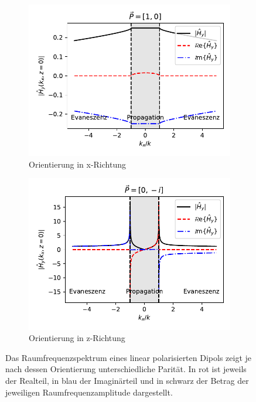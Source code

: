 \documentclass[titlepage,  ngerman]{article}
\begin{document}
	\begin{figure}[h]
		\centering
		\label{fig:spatial_spectrum_zx}
		\begin{subfigure}{0.49\textwidth}
			\centering
			\includegraphics[width=\textwidth]{figures/spatial_spectrum_x.pdf}
			\caption{Orientierung in x-Richtung}
			\label{fig:spatial_spectrum_x}
		\end{subfigure}		
		\begin{subfigure}{0.5\textwidth}
			\centering
			\includegraphics[width=\textwidth]{figures/spatial_spectrum_z.pdf}
			\caption{Orientierung in z-Richtung}
			\label{fig:spatial_spectrum_z}
		\end{subfigure}		
		\caption[Raumfrequenzspektrum linear polarisierter Dipol]{Das Raumfrequenzspektrum eines linear polarisierten Dipols zeigt je nach  dessen Orientierung unterschiedliche Parität. In rot ist jeweils der Realteil, in blau der Imaginärteil und in schwarz der Betrag der jeweiligen Raumfrequenzamplitude dargestellt.}		
	\end{figure}
\end{document}
